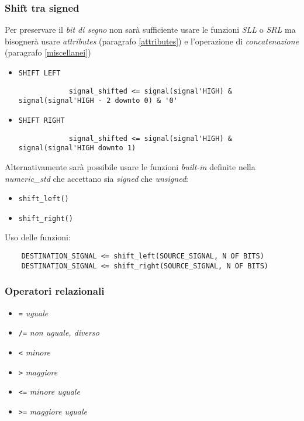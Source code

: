 \documentclass{article}
\begin{document}
\subsubsection{Shift tra signed} \label{signedshift}
Per preservare il \textit{bit di segno} non sarà sufficiente usare le funzioni \textit{SLL} o \textit{SRL} ma bisognerà usare \textit{attributes} (paragrafo \ref{attributes}) e l'operazione di \textit{concatenazione} (paragrafo \ref{miscellanei})

\begin{itemize}
  \item \texttt{SHIFT LEFT}
        \begin{verbatim}
		    signal_shifted <= signal(signal'HIGH) & signal(signal'HIGH - 2 downto 0) & '0'
		\end{verbatim}
  \item \texttt{SHIFT RIGHT}
        \begin{verbatim}
		    signal_shifted <= signal(signal'HIGH) & signal(signal'HIGH downto 1)
		\end{verbatim}
\end{itemize}

Alternativamente sarà possibile usare le funzioni \textit{built-in} definite nella \textit{numeric\_std} che accettano sia \textit{signed} che \textit{unsigned}:
\begin{itemize}
  \item \texttt{shift\_left()}
  \item \texttt{shift\_right()}
\end{itemize}

Uso delle funzioni:
\begin{verbatim}
    DESTINATION_SIGNAL <= shift_left(SOURCE_SIGNAL, N OF BITS)
    DESTINATION_SIGNAL <= shift_right(SOURCE_SIGNAL, N OF BITS)
\end{verbatim}
\subsubsection{Operatori relazionali}
\begin{itemize}
  \item \texttt{=} \textit{uguale}
  \item \texttt{/=} \textit{non uguale, diverso}
  \item \texttt{<} \textit{minore}
  \item \texttt{>} \textit{maggiore}
  \item \texttt{<=} \textit{minore uguale}
  \item \texttt{>=} \textit{maggiore uguale}
\end{itemize}
\end{document}
